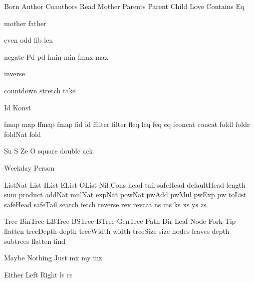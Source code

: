 
\DefRel Born
\DefRel Author
\DefRel Coauthors
\DefRel Read
\DefRel Mother
\DefRel Parents
\DefRel Parent
\DefRel Child
\DefRel Love
\DefRel Contains
\DefRel Eq

\DefFun mother
\DefFun father

\DefFun even
\DefFun odd
\DefFun fib
\DefFun len

\DefFpf negate
\DefFPF Pd pd
\DefFPF fmin   min
\DefFPF fmax   max

\DefFpf inverse

\DefFpf countdown
\DefFpf stretch
\DefFpf take

\DefType Id
\DefType Konst

\DefFPF fmap     map
\DefFPF ffmap    fmap
\DefFPF fid      id
\DefFPF ffilter  filter
\DefFPF fleq     leq
\DefFPF feq      eq
\DefFPF fconcat  concat
\DefFpf foldl
\DefFpf foldr
\DefFpf foldNat
\DefFpf fold

\DefCONS Su S
\DefCONS Ze O
\DefFpf  square
\DefFpf  double
\DefFpf  ack

\DefType Weekday
\DefType Person

\DefType ListNat
\DefType List
\DefType IList
\DefType EList
\DefType OList
\DefCons Nil
\DefCons Cons
\DefFpf  head
\DefFpf  tail
\DefFpf  safeHead
\DefFpf  defaultHead
\DefFpf  length
\DefFpf  sum
\DefFpf  product
\DefFpf  addNat
\DefFpf  mulNat
\DefFpf  expNat
\DefFpf  powNat
\DefFpf  pwAdd
\DefFpf  pwMul
\DefFpf  pwExp
\DefFpf  pw
\DefFpf  toList
\DefFpf  safeHead
\DefFpf  safeTail
\DefFpf  search
\DefFpf  fetch
\DefFpf  reverse
\DefFpf  rev
\DefFpf  revcat
\DefVar  ns
\DefVar  ms
\DefVar  ks
\DefVar  xs
\DefVar  ys
\DefVar  zs

\DefType Tree
\DefType BinTree
\DefType LBTree
\DefType BSTree
\DefType BTree
\DefType GenTree
\DefType Path
\DefType Dir
\DefCons Leaf
\DefCons Node
\DefCons Fork
\DefCons Tip
\DefFpf  flatten
\DefFPF  treeDepth  depth
\DefFPF  treeWidth  width
\DefFPF  treeSize   size
\DefFpf  nodes
\DefFpf  leaves
\DefFpf  depth
\DefFpf  subtrees
\DefFpf  flatten
\DefFpf  find


\DefType Maybe
\DefCons Nothing
\DefCons Just
\DefVar  mx
\DefVar  my
\DefVar  mz

\DefType Either
\DefCons Left
\DefCons Right
\DefVar  ls
\DefVar  rs

\def\bla{\mathrm{bla}}
\def\blu{\mathrm{blu}}

\def\persons{{\cal P}}
\let\pers=\persons

\def\euclid{\algorithmstylize{Euclid}}%

\def\Smile{\rel{\woohoo}}
\def\Frown{\rel{\boohoo}}

\def\oddAs#1{A_{[#1]}}

